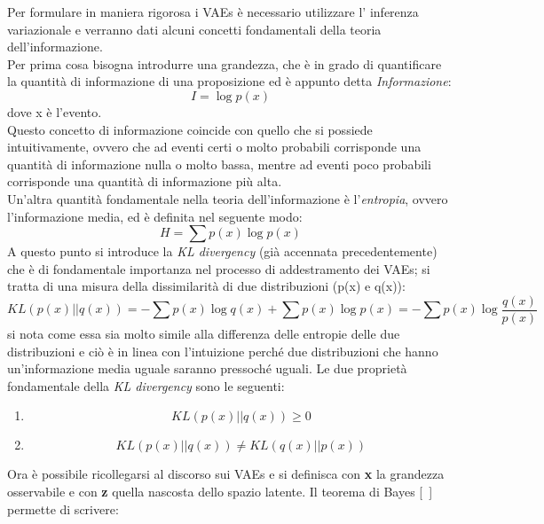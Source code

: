 Per formulare in maniera rigorosa i VAEs è necessario utilizzare l' inferenza variazionale e verranno dati alcuni concetti fondamentali della teoria dell'informazione. \\
Per prima cosa bisogna introdurre una grandezza, che è in grado di quantificare la quantità di informazione di una proposizione ed è appunto detta \textit{Informazione}:
\begin{equation}
	I = \log p(x)
\end{equation}
dove x è l'evento. \\
Questo concetto di informazione coincide con quello che si possiede intuitivamente, ovvero che ad eventi certi o molto probabili corrisponde una quantità di informazione nulla o molto bassa, mentre ad eventi poco probabili corrisponde una quantità di informazione più alta. \\ 
Un'altra quantità fondamentale nella teoria dell'informazione è l'\textit{entropia}, ovvero l'informazione media, ed è definita nel seguente modo:
\begin{equation}
	H = \sum p(x) \log p(x)
\end{equation}
A questo punto si introduce la \textit{KL divergency} (già accennata precedentemente) che è di fondamentale importanza nel processo di addestramento dei VAEs; si tratta di una misura della dissimilarità di due distribuzioni (p(x) e q(x)):
\begin{equation}
	KL(p(x)||q(x)) = -\sum p(x) \log q(x) + \sum p(x) \log p(x) = -\sum p(x) \log \frac{q(x)}{p(x)}
\end{equation}
si nota come essa sia molto simile alla differenza delle entropie delle due distribuzioni e ciò è in linea con l'intuizione perché due distribuzioni che hanno un'informazione media uguale saranno pressoché uguali.
Le due proprietà fondamentale della \textit{KL divergency} sono le seguenti:
\begin{enumerate}
	\item 
	\begin{equation}
		KL(p(x)||q(x)) \geq 0
	\end{equation}
	
	\item 
	\begin{equation}
		KL(p(x)||q(x)) \not = KL(q(x)||p(x))
	\end{equation}
\end{enumerate}
Ora è possibile ricollegarsi al discorso sui VAEs e si definisca con \textbf{x} la grandezza osservabile e con \textbf{z} quella nascosta dello spazio latente. Il teorema di Bayes [~\cite{Statistica}] permette di scrivere:
